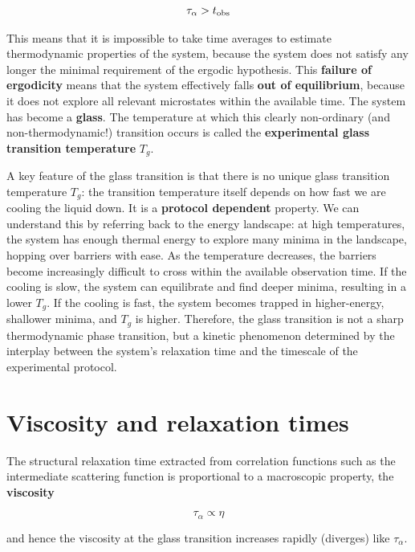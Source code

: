 \documentclass[
  letterpaper,
  enabledeprecatedfontcommands]{report}
\begin{document}
\[\tau_{\alpha}>t_{\rm obs}\]

This means that it is impossible to take time averages to estimate
thermodynamic properties of the system, because the system does not
satisfy any longer the minimal requirement of the ergodic hypothesis.
This \textbf{failure of ergodicity} means that the system effectively
falls \textbf{out of equilibrium}, because it does not explore all
relevant microstates within the available time. The system has become a
\textbf{glass}. The temperature at which this clearly non-ordinary (and
non-thermodynamic!) transition occurs is called the \textbf{experimental
glass transition temperature} \(T_g\).

A key feature of the glass transition is that there is no unique glass
transition temperature \(T_g\): the transition temperature itself
depends on how fast we are cooling the liquid down. It is a
\textbf{protocol dependent} property. We can understand this by
referring back to the energy landscape: at high temperatures, the system
has enough thermal energy to explore many minima in the landscape,
hopping over barriers with ease. As the temperature decreases, the
barriers become increasingly difficult to cross within the available
observation time. If the cooling is slow, the system can equilibrate and
find deeper minima, resulting in a lower \(T_g\). If the cooling is
fast, the system becomes trapped in higher-energy, shallower minima, and
\(T_g\) is higher. Therefore, the glass transition is not a sharp
thermodynamic phase transition, but a kinetic phenomenon determined by
the interplay between the system's relaxation time and the timescale of
the experimental protocol.

\section{Viscosity and relaxation
times}\label{viscosity-and-relaxation-times}

The structural relaxation time extracted from correlation functions such
as the intermediate scattering function is proportional to a macroscopic
property, the \textbf{viscosity}

\[\tau_\alpha \propto \eta\]

and hence the viscosity at the glass transition increases rapidly
(diverges) like \(\tau_\alpha\).
\end{document}
